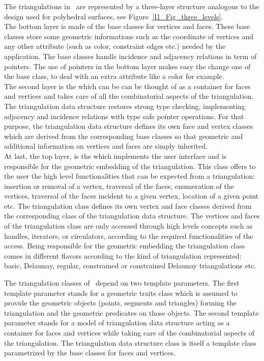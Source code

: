 The triangulations in \cgal\ are represented
by a three-layer structure  analogous to the design used for polyhedral
surfaces, see Figure~\ref{I1_Fig_three_levels}. \\
The bottom layer is made of  the base classes for vertices and faces.
These base classes store some 
geometric informations such as the coordinate of vertices 
and any other attribute (such as color, constraint edges etc.)
needed by the application.
The base classes handle
incidence and adjacency relations in term of  pointers.
The use of  pointers in the bottom layer 
makes easy 
the change one of the base
class, to deal with an extra attribute like a color for example.\\
The second layer is the 
which can be can be thought 
of as a container for faces and vertices
and takes care
of all the combinatorial aspects of the triangulation.
The {triangulation data structure} restores strong type checking,
implementing adjacency and incidence relations 
with type safe pointer operations.
For that purpose, the {triangulation data structure} defines its own face and vertex
classes which are derived
 from the corresponding 
base classes
so that geometric and additional information on vertices and faces 
are simply inherited. \\
  At last, the top layer, is  the 
which implements the user interface
and is responsible for the geometric embedding of the triangulation.
This class offers to the user
the high level functionalities that can be expected from a triangulation:
insertion  or removal of a vertex, traversal of the faces,
enumeration of the vertices,
traversal of the   faces incident to a given vertex, location of a given point etc.
The {triangulation class} defines its own 
vertex and face classes
derived from the corresponding class of the {triangulation data structure}.
The vertices and faces of the {triangulation class}
are only accessed through high levels concepts such as 
handles, iterators, or circulators,
according to the required functionalities of the access.
Being  responsible for the geometric embedding 
the triangulation class
comes in different flavors according to the kind of triangulation represented:
basic, Delaunay, regular, constrained or constrained Delaunay
 triangulations etc.

The triangulation classes of \cgal\ depend on two template parameters.
The first template parameter stands for
 a geometric traits class which is assumed to provide
the geometric objects (points, segments and triangles) 
forming  the triangulation and the geometric predicates on those objects.
The second template parameter stands for a model
of  triangulation data
structure acting as a container for faces and vertices
while  taking care of the combinatorial aspects of the triangulation. 
The triangulation data structure class is itself a template
class parametrized by the base classes for faces and vertices.


